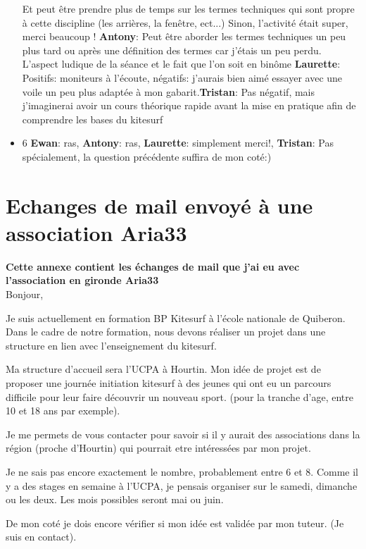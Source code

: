 \documentclass[11pt,a4paper]{report}
\begin{document}
\begin{itemize}
Et peut \^etre prendre plus de temps sur les termes techniques
qui sont propre à cette discipline (les arrières, la fen\^etre, ect...) 
Sinon, l'activité était super, merci beaucoup !
\textbf{Antony}: Peut \^etre aborder les termes techniques un 
peu plus tard ou après une définition des termes car j'étais un
peu perdu. L'aspect ludique de la séance et le fait que l'on
soit en bin\^ome \textbf{Laurette}: Positifs: moniteurs à
l'écoute, négatifs: j'aurais bien aimé essayer avec une
voile un peu plus adaptée à mon gabarit.\textbf{Tristan}: 
Pas négatif, mais j'imaginerai avoir un cours théorique rapide avant
la mise en pratique afin de comprendre les bases du kitesurf
\item 6 \textbf{Ewan}: ras, \textbf{Antony}: ras, 
\textbf{Laurette}: simplement merci!, \textbf{Tristan}: 
Pas spécialement, la question précédente suffira de mon coté:)
\end{itemize}


\chapter{Echanges de mail envoyé à une association Aria33}\label{appendix_mail}
\textbf{Cette annexe contient les échanges de mail que j'ai eu avec l'association 
en gironde Aria33\cite{aria33}} \\

Bonjour,

Je suis actuellement en formation BP Kitesurf à l'école nationale de Quiberon.
Dans le cadre de notre formation, nous devons réaliser un projet dans
une structure en lien avec l'enseignement du kitesurf.

Ma structure d'accueil sera l'UCPA à Hourtin.
Mon idée de projet est de proposer une journée initiation kitesurf à
des jeunes qui ont eu un parcours difficile pour leur faire découvrir
un nouveau sport.
(pour la tranche d'age, entre 10 et 18 ans par exemple).

Je me permets de vous contacter pour savoir si il y aurait des
associations dans la région (proche d'Hourtin) qui pourrait etre
intéressées par mon projet.

Je ne sais pas encore exactement le nombre, probablement entre 6 et 8.
Comme il y a des stages en semaine à l'UCPA, je pensais organiser sur
le samedi, dimanche ou les deux. Les mois possibles seront mai ou
juin.

De mon coté je dois encore vérifier si mon idée est validée par mon
tuteur. (Je suis en contact).
\end{document}

